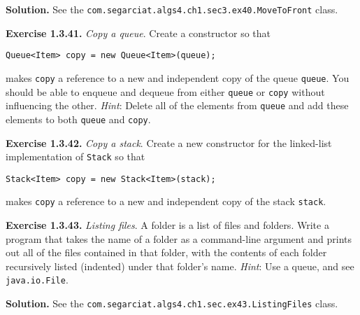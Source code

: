 \documentclass[12pt, a4paper]{article}
\newenvironment{ex}[2][Exercise]
{\par\medskip\noindent \textbf{#1 #2.}}
{\medskip}
\newenvironment{sol}[1][Solution]
{\par\medskip\noindent \textbf{#1.} }
{\medskip}
\begin{document}
	\begin{sol}
		See the \texttt{com.segarciat.algs4.ch1.sec3.ex40.MoveToFront} class.
	\end{sol}
	\begin{ex}{1.3.41}
		\emph{Copy a queue}. Create a constructor so that
		\begin{lstlisting}[language={}]
			Queue<Item> copy = new Queue<Item>(queue);
		\end{lstlisting}
		makes \texttt{copy} a reference to a new and independent copy of the queue \texttt{queue}.
		You should be able to enqueue and dequeue from either \texttt{queue} or \texttt{copy}
		without influencing the other. \emph{Hint}: Delete all of the elements from \texttt{queue}
		and add these elements to both \texttt{queue} and \texttt{copy}.
	\end{ex}
	\begin{ex}{1.3.42}
		\emph{Copy a stack}. Create a new constructor for the linked-list implementation of
		\texttt{Stack} so that
		\begin{lstlisting}[language={}]
			Stack<Item> copy = new Stack<Item>(stack);
		\end{lstlisting}
		makes \texttt{copy} a reference to a new and independent copy of the stack \texttt{stack}.
	\end{ex}
	\begin{ex}{1.3.43}
		\emph{Listing files}. A folder is a list of files and folders. Write a program that takes
		the name of a folder as a command-line argument and prints out all of the files contained
		in that folder, with the contents of each folder recursively listed (indented) under
		that folder's name. \emph{Hint}: Use a queue, and see \texttt{java.io.File}.
	\end{ex}
	\begin{sol}
		See the \texttt{com.segarciat.algs4.ch1.sec.ex43.ListingFiles} class.
	\end{sol}
	\pagebreak
	\printbibliography
\end{document}

